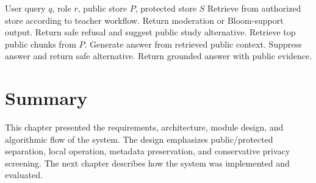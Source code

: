 \begin{algorithm}[H]
\caption{Student-facing guarded RAG workflow}
\begin{algorithmic}[1]
\Require User query $q$, role $r$, public store $P$, protected store $S$
    \State Retrieve from authorized store according to teacher workflow.
    \State Return moderation or Bloom-support output.
\Else
        \State Return safe refusal and suggest public study alternative.
    \EndIf
    \State Retrieve top public chunks from $P$.
    \State Generate answer from retrieved public context.
        \State Suppress answer and return safe alternative.
    \Else
        \State Return grounded answer with public evidence.
    \EndIf
\EndIf
\end{algorithmic}
\end{algorithm}

\section{Summary}

This chapter presented the requirements, architecture, module design, and algorithmic flow of the system. The design emphasizes public/protected separation, local operation, metadata preservation, and conservative privacy screening. The next chapter describes how the system was implemented and evaluated.
